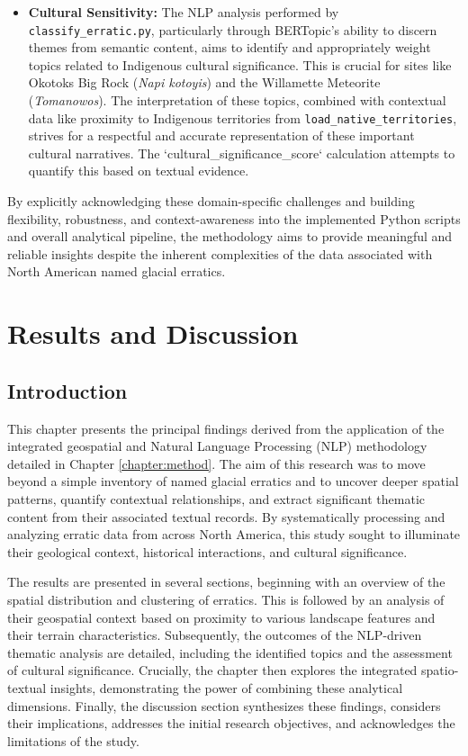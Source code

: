 \documentclass[
11pt, %
english, %
singlespacing, %
headsepline, %
]{MastersDoctoralThesis} %
\begin{document}
\begin{itemize}
    \item \textbf{Cultural Sensitivity:} The NLP analysis performed by \texttt{classify\_erratic.py}, particularly through BERTopic's ability to discern themes from semantic content, aims to identify and appropriately weight topics related to Indigenous cultural significance. This is crucial for sites like Okotoks Big Rock (\emph{Napi kotoyis}) and the Willamette Meteorite (\emph{Tomanowos}). The interpretation of these topics, combined with contextual data like proximity to Indigenous territories from \texttt{load\_native\_territories}, strives for a respectful and accurate representation of these important cultural narratives. The `cultural\_significance\_score` calculation attempts to quantify this based on textual evidence.
\end{itemize}
By explicitly acknowledging these domain-specific challenges and building flexibility, robustness, and context-awareness into the implemented Python scripts and overall analytical pipeline, the methodology aims to provide meaningful and reliable insights despite the inherent complexities of the data associated with North American named glacial erratics.






\chapter{Results and Discussion}
\label{chapter:results}

\section{Introduction}
\label{sec:results_introduction}

This chapter presents the principal findings derived from the application of the integrated geospatial and Natural Language Processing (NLP) methodology detailed in Chapter \ref{chapter:method}. The aim of this research was to move beyond a simple inventory of named glacial erratics and to uncover deeper spatial patterns, quantify contextual relationships, and extract significant thematic content from their associated textual records. By systematically processing and analyzing erratic data from across North America, this study sought to illuminate their geological context, historical interactions, and cultural significance.

The results are presented in several sections, beginning with an overview of the spatial distribution and clustering of erratics. This is followed by an analysis of their geospatial context based on proximity to various landscape features and their terrain characteristics. Subsequently, the outcomes of the NLP-driven thematic analysis are detailed, including the identified topics and the assessment of cultural significance. Crucially, the chapter then explores the integrated spatio-textual insights, demonstrating the power of combining these analytical dimensions. Finally, the discussion section synthesizes these findings, considers their implications, addresses the initial research objectives, and acknowledges the limitations of the study.
\end{document}
